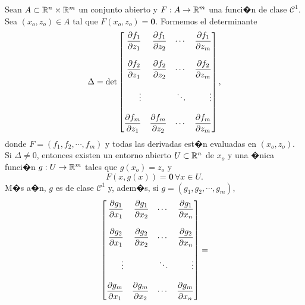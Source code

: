 \documentclass[a4paper]{scrartcl} %
\begin{document}
\begin{theorem} \label{teo:implicit}
\mbox{}

 Sean $A \subset \mathbb{R}^n \times \mathbb{R}^m$ un conjunto abierto y $F: A \to \mathbb{R}^m$ una funci�n de clase $\mathcal{C}^1$. Sea $(x_o,z_o) \in A$ tal que $F(x_o,z_o) = \mathbf{0}$. Formemos el determinante
 \[
  \Delta = \det \begin{bmatrix*}[r]
                \dif{f_1}{z_1} & \dif{f_1}{z_2} & \cdots & \dif{f_1}{z_m} \\
                               &                &        &                \\
                \dif{f_2}{z_1} & \dif{f_2}{z_2} & \cdots & \dif{f_2}{z_m} \\
                               &                &        &                \\
                \vdots         &                & \ddots & \vdots         \\
                               &                &        &                \\
                \dif{f_m}{z_1} & \dif{f_m}{z_2} & \cdots & \dif{f_m}{z_m}
                \end{bmatrix*},
 \]
 donde $F = (f_1, f_2, \cdots , f_m)$ y todas las derivadas est�n evaluadas en $(x_o,z_o)$. Si $\Delta \ne 0$, entonces existen un entorno abierto $U \subset \mathbb{R}^n$ de $x_o$
 y una �nica funci�n $g: U \to \mathbb{R}^m$ tales que $g(x_o) = z_o$ y
 \[
  F(x,g(x)) = \mathbf{0} \, \forall x \in U.
 \]
 M�s a�n, $g$ es de clase $\mathcal{C}^1$ y, adem�s, si $g = (g_1, g_2, \cdots , g_m)$,
 \[
  \begin{bmatrix*}[r]
                \dif{g_1}{x_1} & \dif{g_1}{x_2} & \cdots & \dif{g_1}{x_n} \\
                               &                &        &                \\
                \dif{g_2}{x_1} & \dif{g_2}{x_2} & \cdots & \dif{g_2}{x_n} \\
                               &                &        &                \\
                \vdots         &                & \ddots & \vdots         \\
                               &                &        &                \\
                \dif{g_m}{x_1} & \dif{g_m}{x_2} & \cdots & \dif{g_m}{x_n}
                \end{bmatrix*} =
\]
\end{theorem}
\end{document}
